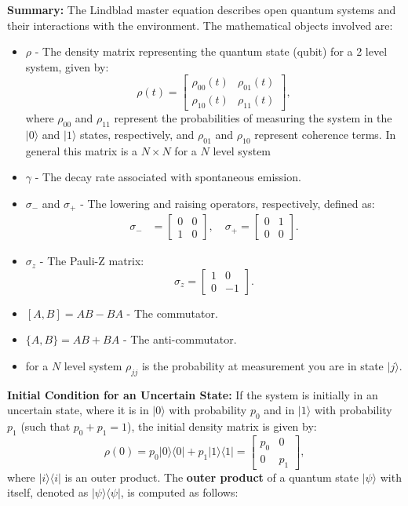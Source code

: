 \documentclass[12pt]{article}
\newcommand{\bra}[1]{\langle #1 |}
\newcommand{\ket}[1]{| #1 \rangle}
\begin{document}
\textbf{Summary:} The Lindblad master equation describes open quantum systems and their interactions with the environment. The mathematical objects involved are:
\begin{itemize}
    \item $\rho$ - The density matrix representing the quantum state (qubit) for a 2 level system, given by:
    \begin{equation*}
        \rho(t) = \begin{bmatrix} \rho_{00}(t) & \rho_{01}(t) \\ \rho_{10}(t) & \rho_{11}(t) \end{bmatrix},
    \end{equation*}
    where $\rho_{00}$ and $\rho_{11}$ represent the probabilities of measuring the system in the $|0\rangle$ and $|1\rangle$ states, respectively, and $\rho_{01}$ and $\rho_{10}$ represent coherence terms. In general this matrix is a $N \times N$ for a $N$ level system
    \item $\gamma$ - The decay rate associated with spontaneous emission.
    \item $\sigma_-$ and $\sigma_+$ - The lowering and raising operators, respectively, defined as:
    \begin{align*}
        \sigma_- &= \begin{bmatrix} 0 & 0 \\ 1 & 0 \end{bmatrix}, \quad
        \sigma_+ = \begin{bmatrix} 0 & 1 \\ 0 & 0 \end{bmatrix}.
    \end{align*}
    \item $\sigma_z$ - The Pauli-Z matrix:
    \begin{equation*}
        \sigma_z = \begin{bmatrix} 1 & 0 \\ 0 & -1 \end{bmatrix}.
    \end{equation*}
    \item $[A, B] = AB - BA$ - The commutator.
    \item $\{A, B\} = AB + BA$ - The anti-commutator.
    \item for a $N$ level system $\rho_{jj}$ is the probability at measurement you are in state $\ket{j}$.
\end{itemize}

\textbf{Initial Condition for an Uncertain State:} If the system is initially in an uncertain state, where it is in $|0\rangle$ with probability $p_0$ and in $|1\rangle$ with probability $p_1$ (such that $p_0 + p_1 = 1$), the initial density matrix is given by:
\begin{equation*}
    \rho(0) = p_0 |0\rangle \langle 0| + p_1 |1\rangle \langle 1| = \begin{bmatrix} p_0 & 0 \\ 0 & p_1 \end{bmatrix},
\end{equation*}
where $\ket{i}\bra{i}$ is an outer product. The \textbf{outer product} of a quantum state \( |\psi\rangle \) with itself, denoted as \( |\psi\rangle \langle \psi| \), is computed as follows:
\end{document}

